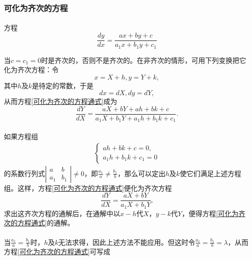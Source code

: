 \subsubsection{可化为齐次的方程}
\paragraph{}
方程
\begin{equation}
  \label{可化为齐次的方程通式}
  \frac{dy}{dx} = \frac{ax+by+c}{a_1x+b_1y+c_1}
\end{equation}

当$c=c_1=0$时是齐次的，否则不是齐次的。在非齐次的情形，可用下列变换把它化为齐次方程：令
\begin{equation*}
  x = X + h, y = Y + k,
\end{equation*}
其中$h$及$k$是待定的常数，于是
\begin{equation*}
  dx = dX, dy = dY,
\end{equation*}
从而方程\eqref{可化为齐次的方程通式}成为
\begin{equation*}
  \frac{dY}{dX} = \frac{aX+bY+ah+bk+c}{a_1X+b_1Y+a_1h+b_1k+c_1}.
\end{equation*}

\paragraph{}
如果方程组
\begin{align*}
  \left\{\begin{array}{l}
    ah + bk + c = 0, \\
    a_1h+b_1k+c_1 = 0
  \end{array} \right.
\end{align*}
的系数行列式\vspace{0.5\baselineskip}$\displaystyle \left|\begin{array}{ll}
  a & b \\ a_1 & b_1
\end{array} \right| \neq 0$，即$\displaystyle \frac{a_1}{a} \neq \frac{b_1}{b}$，那么可以定出$h$及$k$使它们满足上述方程组。这样，方程\eqref{可化为齐次的方程通式}便化为齐次方程
\begin{equation*}
  \frac{dY}{dX} = \frac{aX+bY}{a_1X+b_1Y}.
\end{equation*}
求出这齐次方程的通解后，在通解中以$x-h$代$X$，$y-k$代$Y$，便得方程\eqref{可化为齐次的方程通式}的通解。

\paragraph{}
当$\displaystyle \frac{a_1}{a}=\frac{b_1}{b}$时，$h$及$k$无法求得，因此上述方法不能应用。但这时令$\displaystyle \frac{a_1}{a}=\frac{b_1}{b}=\lambda$，从而方程\eqref{可化为齐次的方程通式}可写成

